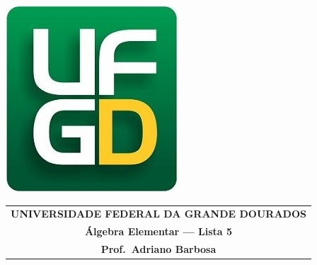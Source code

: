 \documentclass[a4paper,5pt]{amsbook}
\begin{document}
\thispagestyle{empty}
\pagestyle{empty}
\begin{minipage}[h]{0.14\textwidth}
	\includegraphics[scale=0.24]{../ufgd.png}
\end{minipage}
\begin{minipage}[h]{\textwidth}
\begin{tabular}{c}
{{\bf UNIVERSIDADE FEDERAL DA GRANDE DOURADOS}}\\
{{\bf \'Algebra Elementar --- Lista 5}}\\
{{\bf Prof.\ Adriano Barbosa}}\\
\end{tabular}
\vspace{-0.45cm}
%
\end{minipage}

\end{document}
